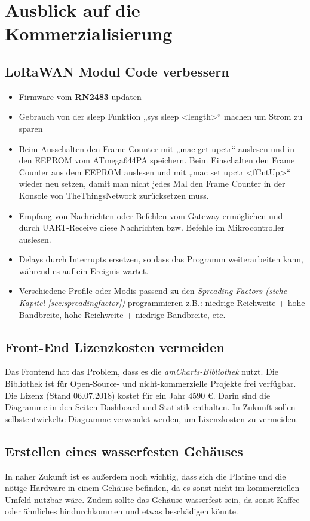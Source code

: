 \chapter{Ausblick auf die Kommerzialisierung}
\section{LoRaWAN Modul Code verbessern}
\begin{itemize}
    \item Firmware vom \textbf{RN2483} updaten
    \item Gebrauch von der sleep Funktion „sys sleep <length>“ machen um Strom zu sparen
    \item Beim Ausschalten den Frame-Counter mit „mac get upctr“ auslesen und in den EEPROM vom ATmega644PA speichern. Beim Einschalten den Frame Counter aus dem EEPROM auslesen und mit „mac set upctr <fCntUp>“ wieder neu setzen, damit man nicht jedes Mal den Frame Counter in der Konsole von TheThingsNetwork zurücksetzen muss. 
    \item Empfang von Nachrichten oder Befehlen vom Gateway ermöglichen und durch UART-Receive diese Nachrichten bzw. Befehle im Mikrocontroller auslesen. 
    \item Delays durch Interrupts ersetzen, so dass das Programm weiterarbeiten kann, während es auf ein Ereignis wartet.
    \item Verschiedene Profile oder Modis passend zu den \textit{Spreading Factors (siehe Kapitel \ref{sec:spreadingfactor})} programmieren z.B.: niedrige Reichweite + hohe Bandbreite, hohe Reichweite + niedrige Bandbreite, etc.
\end{itemize} 
\section{Front-End Lizenzkosten vermeiden}
Das Frontend hat das Problem, dass es die \textit{amCharts-Bibliothek} nutzt. Die Bibliothek ist für Open-Source- und nicht-kommerzielle Projekte frei verfügbar. Die Lizenz (Stand 06.07.2018) kostet für ein Jahr 4590 \euro. Darin sind die Diagramme in den Seiten Dashboard und Statistik enthalten. In Zukunft sollen selbstentwickelte Diagramme verwendet werden, um Lizenzkosten zu vermeiden.
\newpage
\section{Erstellen eines wasserfesten Gehäuses}
In naher Zukunft ist es außerdem noch wichtig, dass sich die Platine und die nötige Hardware in einem Gehäuse befinden, da es sonst nicht im kommerziellen Umfeld nutzbar wäre. Zudem sollte das Gehäuse wasserfest sein, da sonst Kaffee oder ähnliches hindurchkommen und etwas beschädigen könnte.\\

